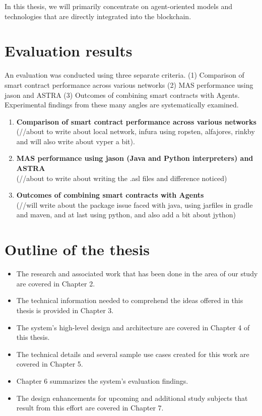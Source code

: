 In this thesis, we will primarily concentrate on agent-oriented models and technologies that are directly integrated into the blockchain.

\section{Evaluation results}

An evaluation was conducted using three separate criteria. (1) Comparison of smart contract performance across various networks (2) \ac{MAS} performance using jason and \ac{ASTRA} (3) Outcomes of combining smart contracts with Agents. Experimental findings from these many angles are systematically examined.

\newcommand\descitem[1]{\item{\bfseries #1}\\}
\begin{enumerate}
  \descitem{Comparison of smart contract performance across various networks} (//about to write about local network, infura using ropsten, alfajores, rinkby and will also write about vyper a bit).
  \descitem{\ac{MAS} performance using jason (Java and Python interpreters) and \ac{ASTRA}} (//about to write about writing the .asl files and difference noticed)
  \descitem{Outcomes of combining smart contracts with Agents} (//will write about the package issue faced with java, using jarfiles in gradle and maven, and at last using python, and also add a bit about jython)
\end{enumerate}


\section{Outline of the thesis}
\begin{itemize}
    \item The research and associated work that has been done in the area of our study are covered in Chapter 2.
    \item The technical information needed to comprehend the ideas offered in this thesis is provided in Chapter 3.
    \item The system's high-level design and architecture are covered in Chapter 4 of this thesis.
    \item The technical details and several sample use cases created for this work are covered in Chapter 5.
    \item Chapter 6 summarizes the system's evaluation findings.
    \item The design enhancements for upcoming and additional study subjects that result from this effort are covered in Chapter 7.
\end{itemize}